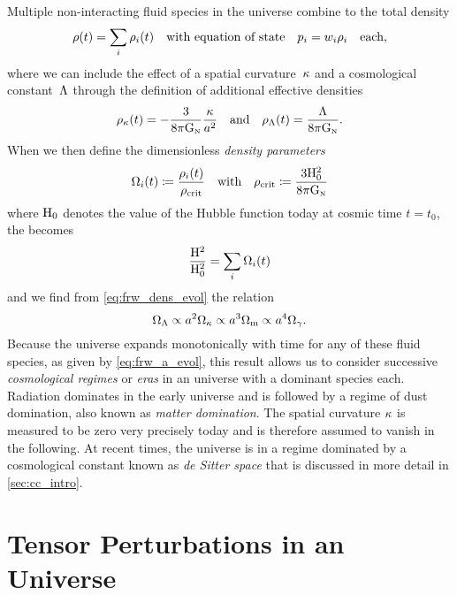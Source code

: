 Multiple non-interacting fluid species in the universe combine to the total density
\begin{equation}
	\rho(t) = \sum_i \rho_i(t) \quad \text{with equation of state} \quad p_i = w_i\rho_i \quad \text{each,}
\end{equation}
where we can include the effect of a spatial curvature~\(\kappa\) and a cosmological constant~\(\Lambda\) through the definition of additional effective densities
\begin{equation}
	\rho_\kappa(t) = -\frac{3}{8\pi\mathrm{G}_\textnormal{\tiny{N}}}\frac{\kappa}{a^2} \quad \text{and} \quad \rho_\Lambda(t) = \frac{\Lambda}{8\pi\mathrm{G}_\textnormal{\tiny{N}}}.
\end{equation}
When we then define the dimensionless \emph{density parameters}
\begin{equation}
	\Omega_i(t) \coloneqq \frac{\rho_i(t)}{\rho_\textnormal{crit}} \quad \text{with} \quad \rho_\textnormal{crit} \coloneqq \frac{3\mathrm{H}_0^2}{8\pi\mathrm{G}_\textnormal{\tiny{N}}}
\end{equation}
where \(\mathrm{H}_0\) denotes the value of the Hubble function today at cosmic time \(t=t_0\), the  becomes
\begin{equation}\label{eq:friedmann_normalized_dens}
	\frac{\mathrm{H}^2}{\mathrm{H}_0^2} = \sum_i \Omega_i(t)
\end{equation}
and we find from \eqref{eq:frw_dens_evol} the relation
\begin{equation}
	\Omega_\Lambda \propto a^2 \Omega_\kappa \propto a^3 \Omega_{\mathrm{m}} \propto a^4 \Omega_\gamma \mathpunct{.}
\end{equation}
Because the universe expands monotonically with time for any of these fluid species, as given by \eqref{eq:frw_a_evol}, this result allows us to consider successive \emph{cosmological regimes} or \emph{eras} in an \FLRW{} universe with a dominant species each. Radiation dominates in the early universe and is followed by a regime of dust domination, also known as \emph{matter domination}. The spatial curvature \(\kappa\) is measured to be zero very precisely today and is therefore assumed to vanish in the following. At recent times, the universe is in a regime dominated by a cosmological constant known as \emph{de Sitter space} that is discussed in more detail in \autoref{sec:cc_intro}.


\section{Tensor Perturbations in an \FLRW{} Universe}\label{sec:perturb}

